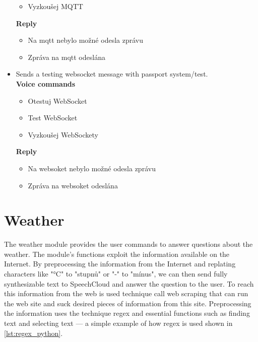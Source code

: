 \begin{itemize}
\begin{itemize}
        \item Vyzkoušej MQTT
    \end{itemize}
    \textbf{Reply}
    \begin{itemize}
        \item Na mqtt nebylo možné odesla zprávu
        \item Zpráva na mqtt odeslána
    \end{itemize}
    \item Sends a testing websocket message with passport system/test.\\
    \textbf{Voice commands}
    \begin{itemize}
        \item Otestuj WebSocket
        \item Test WebSocket
        \item Vyzkoušej WebSockety
    \end{itemize}
    \textbf{Reply}
    \begin{itemize}
        \item Na websoket nebylo možné odesla zprávu
        \item Zpráva na websoket odeslána
    \end{itemize}
\end{itemize}

\section{Weather}

The weather module provides the user commands to answer questions about the weather. The module's functions exploit the information available on the Internet. By preprocessing the information from the Internet and replating characters like "°C" to "stupnů" or "-" to "mínus", we can then send fully synthesizable text to SpeechCloud and answer the question to the user. To reach this information from the web is used technique call web scraping that can run the web site and suck desired pieces of information from this site. Preprocessing the information uses the technique regex and essential functions such as finding text and selecting text — a simple example of how regex is used shown in \cref{lst:regex_python}.

% 



